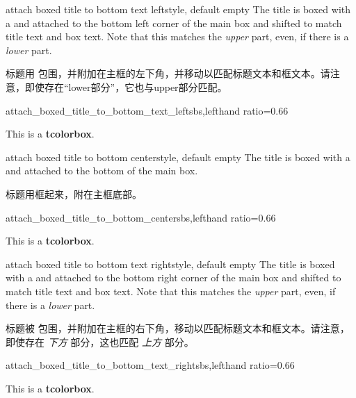 \begin{docTcbKey}[][doc new=2021-07-30]{attach boxed title to bottom text left}{}{style, default empty}
The title is boxed with a  and attached to
the bottom left corner of the main box
and shifted to match title text and box text.
Note that this matches the \emph{upper} part, even, if there is a \emph{lower} part.

标题用  包围，并附加在主框的左下角，并移动以匹配标题文本和框文本。请注意，即使存在“lower部分”，它也与upper部分匹配。
\begin{exdispExample*}{attach_boxed_title_to_bottom_text_left}{sbs,lefthand ratio=0.66}
\begin{tcolorbox}[enhanced,title=My title,
  attach boxed title to bottom text left]
  This is a \textbf{tcolorbox}.
\end{tcolorbox}
\end{exdispExample*}
\end{docTcbKey}


\begin{docTcbKey}{attach boxed title to bottom center}{}{style, default empty}
The title is boxed with a  and attached to
the bottom of the main box.

标题用框起来，附在主框底部。
\begin{exdispExample*}{attach_boxed_title_to_bottom_center}{sbs,lefthand ratio=0.66}
\begin{tcolorbox}[enhanced,title=My title,
  attach boxed title to bottom center]
  This is a \textbf{tcolorbox}.
\end{tcolorbox}
\end{exdispExample*}
\end{docTcbKey}


\begin{docTcbKey}[][doc new=2021-07-30]{attach boxed title to bottom text right}{}{style, default empty}
The title is boxed with a  and attached to
the bottom right corner of the main box
and shifted to match title text and box text.
Note that this matches the \emph{upper} part, even, if there is a \emph{lower} part.

标题被  包围，并附加在主框的右下角，移动以匹配标题文本和框文本。请注意，即使存在 \emph{下方} 部分，这也匹配 \emph{上方} 部分。
\begin{exdispExample*}{attach_boxed_title_to_bottom_text_right}{sbs,lefthand ratio=0.66}
\begin{tcolorbox}[enhanced,title=My title,
  halign=right,
  attach boxed title to bottom text right]
  This is a \textbf{tcolorbox}.
\end{tcolorbox}
\end{exdispExample*}
\end{docTcbKey}


